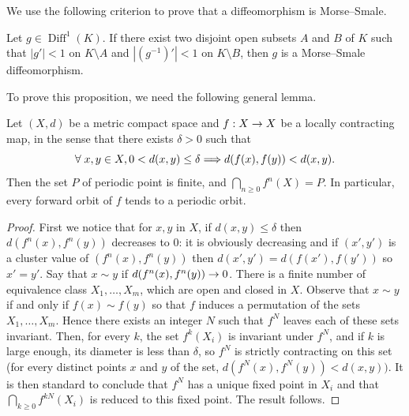 \documentclass[AHL,Unicode,longabstracts,published]{cedram}
\DeclareMathOperator{\Diff}{Diff}
\renewcommand*{\to}{\mathchoice{\longrightarrow}{\rightarrow}{\rightarrow}{\rightarrow}}
\renewcommand*{\implies}{\mathchoice{\Longrightarrow}{\Rightarrow}{\Rightarrow}{\Rightarrow}}
\let\oldforall\forall
\renewcommand*{\forall}{\mathrel{\oldforall}}
\begin{document}
We use the following criterion to prove that a diffeomorphism is Morse--Smale.


\begin{prop}\label{MorseSmaleCriterium}

Let $g\in \Diff^1(K)$. If there exist two disjoint open subsets $A$ and $B$ of $K$ such that $|g'|<1$ on $K\setminus A$ and $|(g^{-1})'|<1$ on $K\setminus B$, then $g$ is a Morse--Smale diffeomorphism.
\end{prop}


To prove this proposition, we need the following general lemma.

\begin{lemm}\label{lemcontraction}
Let $(X,d)$ be a metric compact space and $f:X\to X$ be a locally contracting map, in the sense that there exists $\delta>0$ such that
\[
\forall x,y\in X, 0< d(x,y)\leq \delta \implies d(f(x),f(y))<d(x,y).
\]
Then the set $P$ of periodic point is finite, and $\bigcap_{n\ge 0}f^n(X)=P$. In particular, every forward orbit of $f$ tends to a periodic orbit.
\end{lemm}
\begin{proof}
First we notice that for $x,y$ in $X$, if $d(x,y)\leq \delta$ then $d(f^n(x),f^n(y))$ decreases to $0$: it is obviously decreasing and if $(x',y')$ is a cluster value of $(f^n(x),f^n(y))$ then $d(x',y')=d(f(x'),f(y'))$ so $x'=y'$. Say that $x\sim y$ if $d(f^n(x),f^n(y))\to 0$. There is a finite number of equivalence class $X_1,\dots,X_m$, which are open and closed in $X$. Observe that $x\sim y$ if and only if $f(x)\sim f(y)$ so that $f$ induces a permutation of the sets $X_1,\dots,X_m$. Hence there exists an integer $N$ such that $f^N$ leaves each of these sets invariant. Then, for every $k$, the set $f^k(X_i)$ is invariant under $f^N$, and if $k$ is large enough, its diameter is less than $\delta$, so $f^N$ is strictly contracting on this set (for every distinct points $x$ and $y$ of the set, $d(f^N(x),f^N(y))<d(x,y))$. It is then standard to conclude that $f^N$ has a unique fixed point in $X_i$ and that $\bigcap_{k\ge 0} f^{kN}(X_i)$ is reduced to this fixed point. The result follows.
\end{proof}
\end{document}
